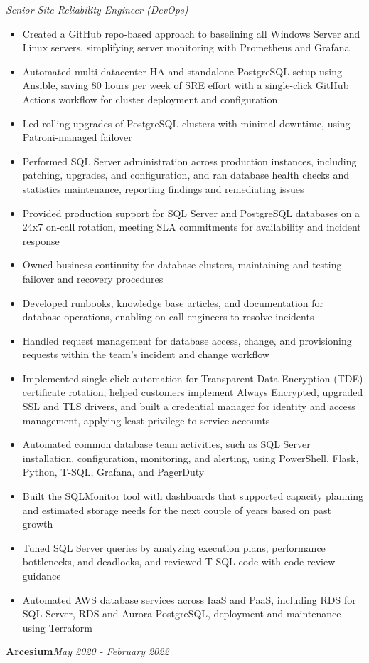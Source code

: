 \documentclass[10pt,a4paper]{article}
\begin{document}
\textit{Senior Site Reliability Engineer (DevOps)}\\[-5pt]
\begin{itemize}
  \item Created a GitHub repo-based approach to baselining all Windows Server and Linux servers, simplifying server monitoring with Prometheus and Grafana
  \item Automated multi-datacenter HA and standalone PostgreSQL setup using Ansible, saving 80 hours per week of SRE effort with a single-click GitHub Actions workflow for cluster deployment and configuration
  \item Led rolling upgrades of PostgreSQL clusters with minimal downtime, using Patroni-managed failover
  \item Performed SQL Server administration across production instances, including patching, upgrades, and configuration, and ran database health checks and statistics maintenance, reporting findings and remediating issues
  \item Provided production support for SQL Server and PostgreSQL databases on a 24x7 on-call rotation, meeting SLA commitments for availability and incident response
  \item Owned business continuity for database clusters, maintaining and testing failover and recovery procedures
  \item Developed runbooks, knowledge base articles, and documentation for database operations, enabling on-call engineers to resolve incidents
  \item Handled request management for database access, change, and provisioning requests within the team's incident and change workflow
  \item Implemented single-click automation for Transparent Data Encryption (TDE) certificate rotation, helped customers implement Always Encrypted, upgraded SSL and TLS drivers, and built a credential manager for identity and access management, applying least privilege to service accounts
  \item Automated common database team activities, such as SQL Server installation, configuration, monitoring, and alerting, using PowerShell, Flask, Python, T-SQL, Grafana, and PagerDuty
  \item Built the SQLMonitor tool with dashboards that supported capacity planning and estimated storage needs for the next couple of years based on past growth
  \item Tuned SQL Server queries by analyzing execution plans, performance bottlenecks, and deadlocks, and reviewed T-SQL code with code review guidance
  \item Automated AWS database services across IaaS and PaaS, including RDS for SQL Server, RDS and Aurora PostgreSQL, deployment and maintenance using Terraform
\end{itemize}
\vspace{14.7pt}
\noindent\textbf{Arcesium}\hfill \textit{May 2020 - February 2022}
\end{document}
